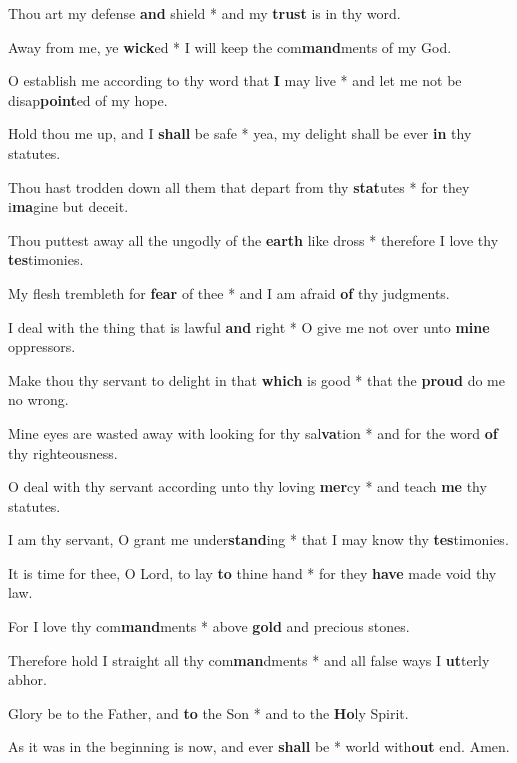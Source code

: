 \begin{multicols}{2}
	Thou art my defense \textbf{and} shield * and my \textbf{trust} is in thy word.
	
	Away from me, ye \textbf{wick}ed * I will keep the com\textbf{mand}ments of my God.
	
	O establish me according to thy word that \textbf{I} may live * and let me not be disap\textbf{point}ed of my hope.
	
	Hold thou me up, and I \textbf{shall} be safe * yea, my delight shall be ever \textbf{in} thy statutes.
	
	Thou hast trodden down all them that depart from thy \textbf{stat}utes * for they i\textbf{ma}gine but deceit.
	
	Thou puttest away all the ungodly of the \textbf{earth} like dross * therefore I love thy \textbf{tes}timonies.
	
	My flesh trembleth for \textbf{fear} of thee * and I am afraid \textbf{of} thy judgments.
	
	I deal with the thing that is lawful \textbf{and} right * O give me not over unto \textbf{mine} oppressors.
	
	Make thou thy servant to delight in that \textbf{which} is good * that the \textbf{proud} do me no wrong.
	
	Mine eyes are wasted away with looking for thy sal\textbf{va}tion * and for the word \textbf{of} thy righteousness.
	
	O deal with thy servant according unto thy loving \textbf{mer}cy * and teach \textbf{me} thy statutes.
	
	I am thy servant, O grant me under\textbf{stand}ing * that I may know thy \textbf{tes}timonies.
	
	It is time for thee, O Lord, to lay \textbf{to} thine hand * for they \textbf{have} made void thy law.
	
	For I love thy com\textbf{mand}ments * above \textbf{gold} and precious stones.
	
	Therefore hold I straight all thy com\textbf{man}dments * and all false ways I \textbf{ut}terly abhor. 
	
	Glory be to the Father, and \textbf{to} the Son * and to the \textbf{Ho}ly Spirit.
	
	As it was in the beginning is now, and ever \textbf{shall} be * world with\textbf{out} end. Amen.
\end{multicols}